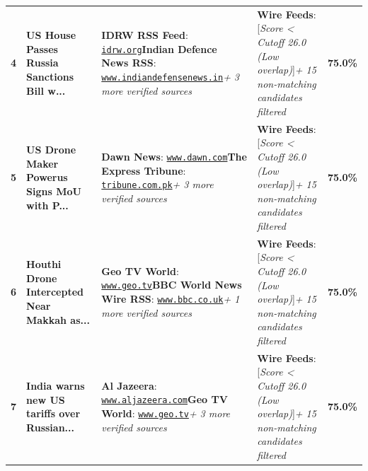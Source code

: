 \documentclass[8.5pt,a4paper]{article}
\begin{document}
{\begin{tabularx}{\textwidth}{@{} c p{3.4cm} p{6.8cm} p{6.8cm} c @{}}
\textbf{4} & \textbf{US House Passes Russia Sanctions Bill w...} & \textbf{IDRW RSS Feed}: \href{https://idrw.org/india-others-face-100-tariffs-as-us-house-advances-russia-sanctions-bill/}{\texttt{idrw.org}}\newline \textbf{Indian Defence News RSS}: \href{https://www.indiandefensenews.in/2026/09/us-house-clears-russia-sanctions-bill.html}{\texttt{www.indiandefensenews.in}}\newline \textit{+ 3 more verified sources} & \textbf{Wire Feeds}: [\textit{Score < Cutoff 26.0 (Low overlap)}]\newline \textit{+ 15 non-matching candidates filtered} & \textbf{75.0\%} \\
\textbf{5} & \textbf{US Drone Maker Powerus Signs MoU with P...} & \textbf{Dawn News}: \href{https://www.dawn.com/news/2030619/us-drone-maker-powerus-says-it-signed-mou-with-pakistan-army-gets-initial-order}{\texttt{www.dawn.com}}\newline \textbf{The Express Tribune}: \href{https://tribune.com.pk/story/2629835/us-drone-maker-powerus-signs-pakistan-army-mou-gets-initial-order}{\texttt{tribune.com.pk}}\newline \textit{+ 3 more verified sources} & \textbf{Wire Feeds}: [\textit{Score < Cutoff 26.0 (Low overlap)}]\newline \textit{+ 15 non-matching candidates filtered} & \textbf{75.0\%} \\
\textbf{6} & \textbf{Houthi Drone Intercepted Near Makkah as...} & \textbf{Geo TV World}: \href{https://www.geo.tv/latest/682272-houthi-drone-intercepted-near-makkah-as-saudi-coalition-warns-holy-sites-are-red-line}{\texttt{www.geo.tv}}\newline \textbf{BBC World News Wire RSS}: \href{https://www.bbc.co.uk/news/articles/cr89jqd1w45eo?at_medium=RSS&at_campaign=rss}{\texttt{www.bbc.co.uk}}\newline \textit{+ 1 more verified sources} & \textbf{Wire Feeds}: [\textit{Score < Cutoff 26.0 (Low overlap)}]\newline \textit{+ 15 non-matching candidates filtered} & \textbf{75.0\%} \\
\textbf{7} & \textbf{India warns new US tariffs over Russian...} & \textbf{Al Jazeera}: \href{https://www.aljazeera.com/news/2026/9/17/india-warns-new-us-tariffs-over-russian-oil-could-impact-ties}{\texttt{www.aljazeera.com}}\newline \textbf{Geo TV World}: \href{https://www.geo.tv/category/world}{\texttt{www.geo.tv}}\newline \textit{+ 3 more verified sources} & \textbf{Wire Feeds}: [\textit{Score < Cutoff 26.0 (Low overlap)}]\newline \textit{+ 15 non-matching candidates filtered} & \textbf{75.0\%} \\

\end{tabularx}}
\end{document}
